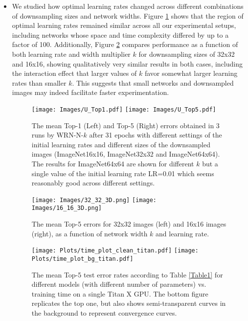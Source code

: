 \documentclass{article} \usepackage{iclr2017_conference,times}
\begin{document}
\begin{itemize}
\item We studied how optimal learning rates changed across different combinations of downsampling sizes and network widths. Figure \ref{Figure3} shows that the region of optimal learning rates remained similar across all our experimental setups, including networks whose space and time complexity differed by up to a factor of 100.
Additionally, Figure \ref{fig:three_d_plots} compares performance as a function of both learning rate and width multiplier $k$ for downsampling sizes of 32x32 and 16x16, showing qualitatively very similar results in both cases, including the interaction effect that larger values of $k$ favor somewhat larger learning rates than smaller $k$. 
This suggests that small networks and 
downsampled images may indeed facilitate faster experimentation. 

\begin{figure}[tbp]
\begin{center}
\texttt{[image: Images/U\_Top1.pdf]}
\texttt{[image: Images/U\_Top5.pdf]}
\end{center}
\caption{The mean Top-1 (Left) and Top-5 (Right) errors obtained in 3 runs by WRN-N-$k$ after 31 epochs with different settings of the initial learning rates and different sizes of the downsampled images (ImageNet16x16, ImageNet32x32 and ImageNet64x64). The results for ImageNet64x64 are shown for different $k$ but a single value of the initial learning rate LR=0.01 which seems reasonably good across different settings.\label{Figure3}}
\end{figure}


\begin{figure}[h]
\begin{center}
\texttt{[image: Images/32\_32\_3D.png]}
\texttt{[image: Images/16\_16\_3D.png]}
\end{center}
\caption{The mean Top-5 errors for 32x32 images (left) and 16x16 images (right), as a function of network width $k$ and learning rate.\label{fig:three_d_plots}}
\end{figure}

\begin{figure}[tb]
\begin{center}
\texttt{[image: Plots/time\_plot\_clean\_titan.pdf]}
\texttt{[image: Plots/time\_plot\_bg\_titan.pdf]}
\end{center}
\caption{The mean Top-5 test error rates according to Table \ref{Table1} for different models (with different number of parameters) vs. training time on a single Titan X GPU. The bottom figure replicates the top one, but also shows semi-transparent curves in the background to represent convergence curves.}
\label{Figure4}
\end{figure}


\end{itemize}
\end{document}
